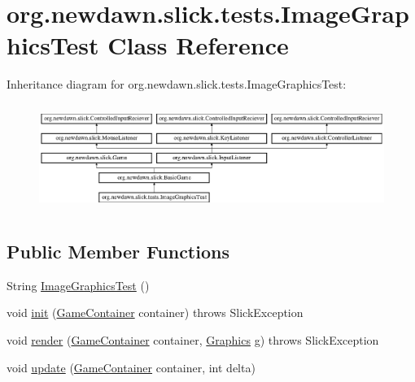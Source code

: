 \hypertarget{classorg_1_1newdawn_1_1slick_1_1tests_1_1_image_graphics_test}{}\section{org.\+newdawn.\+slick.\+tests.\+Image\+Graphics\+Test Class Reference}
\label{classorg_1_1newdawn_1_1slick_1_1tests_1_1_image_graphics_test}
Inheritance diagram for org.\+newdawn.\+slick.\+tests.\+Image\+Graphics\+Test\+:\begin{figure}[H]
\begin{center}
\leavevmode
\includegraphics[height=3.522012cm]{classorg_1_1newdawn_1_1slick_1_1tests_1_1_image_graphics_test}
\end{center}
\end{figure}
\subsection*{Public Member Functions}
\begin{DoxyCompactItemize}
\item 
String \mbox{\hyperlink{classorg_1_1newdawn_1_1slick_1_1tests_1_1_image_graphics_test_a0d09d132277916b2a98c6ddb088ff07c}{Image\+Graphics\+Test}} ()
\item 
void \mbox{\hyperlink{classorg_1_1newdawn_1_1slick_1_1tests_1_1_image_graphics_test_a36faf2ef2a49cc28a20fb2d9a0c7a519}{init}} (\mbox{\hyperlink{classorg_1_1newdawn_1_1slick_1_1_game_container}{Game\+Container}} container)  throws Slick\+Exception 
\item 
void \mbox{\hyperlink{classorg_1_1newdawn_1_1slick_1_1tests_1_1_image_graphics_test_a08dd35007f428d559c5fd864245ba0ad}{render}} (\mbox{\hyperlink{classorg_1_1newdawn_1_1slick_1_1_game_container}{Game\+Container}} container, \mbox{\hyperlink{classorg_1_1newdawn_1_1slick_1_1_graphics}{Graphics}} g)  throws Slick\+Exception 
\item 
void \mbox{\hyperlink{classorg_1_1newdawn_1_1slick_1_1tests_1_1_image_graphics_test_ab7435a4e85465d647a719bc1768bfa0e}{update}} (\mbox{\hyperlink{classorg_1_1newdawn_1_1slick_1_1_game_container}{Game\+Container}} container, int delta)
\end{DoxyCompactItemize}
